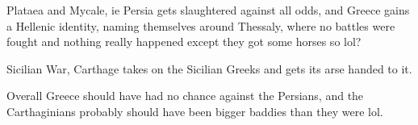 \documentclass[twoside, a4paper, 12pt]{article}
\begin{document}
\par\vspace{1em}

Plataea and Mycale, ie Persia gets slaughtered against all odds, and
Greece gains a Hellenic identity, naming themselves around Thessaly, where
no battles were fought and nothing really happened except they got some horses
so lol?

\par\vspace{1em}

Sicilian War, Carthage takes on the Sicilian Greeks and gets its arse handed to
it.

\par\vspace{1em}

Overall Greece should have had no chance against the Persians, and the
Carthaginians probably should have been bigger baddies than they were lol.

\newpage

\listoffigures
\printbibliography
\end{document}
